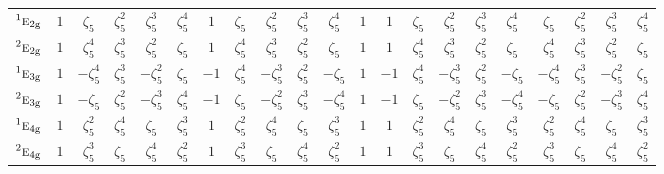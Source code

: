 \documentclass[10pt,a4paper]{article}
\numberwithin{equation}{section}
\newcommand{\irr}[1]{\text{\normalfont\scshape #1}}
\newcommand{\conjpair}[1]{{}^{#1}}
\newcommand{\ptag}[1]{\mathrm{#1}}
\newcommand{\rootunity}[1]{\zeta_{#1}}
\begin{document}
{\begin{longtable}{@{}lcccccccccccccccccccc@{}}
$\conjpair{1}\irr{e}_{2\ptag{g}}$ & $1$ & $\rootunity{5}$ & $\rootunity{5}^{2}$ & $\rootunity{5}^{3}$ & $\rootunity{5}^{4}$ & $1$ & $\rootunity{5}$ & $\rootunity{5}^{2}$ & $\rootunity{5}^{3}$ & $\rootunity{5}^{4}$ & $1$ & $1$ & $\rootunity{5}$ & $\rootunity{5}^{2}$ & $\rootunity{5}^{3}$ & $\rootunity{5}^{4}$ & $\rootunity{5}$ & $\rootunity{5}^{2}$ & $\rootunity{5}^{3}$ & $\rootunity{5}^{4}$\\
$\conjpair{2}\irr{e}_{2\ptag{g}}$ & $1$ & $\rootunity{5}^{4}$ & $\rootunity{5}^{3}$ & $\rootunity{5}^{2}$ & $\rootunity{5}$ & $1$ & $\rootunity{5}^{4}$ & $\rootunity{5}^{3}$ & $\rootunity{5}^{2}$ & $\rootunity{5}$ & $1$ & $1$ & $\rootunity{5}^{4}$ & $\rootunity{5}^{3}$ & $\rootunity{5}^{2}$ & $\rootunity{5}$ & $\rootunity{5}^{4}$ & $\rootunity{5}^{3}$ & $\rootunity{5}^{2}$ & $\rootunity{5}$\\
$\conjpair{1}\irr{e}_{3\ptag{g}}$ & $1$ & $-\rootunity{5}^{4}$ & $\rootunity{5}^{3}$ & $-\rootunity{5}^{2}$ & $\rootunity{5}$ & $-1$ & $\rootunity{5}^{4}$ & $-\rootunity{5}^{3}$ & $\rootunity{5}^{2}$ & $-\rootunity{5}$ & $1$ & $-1$ & $\rootunity{5}^{4}$ & $-\rootunity{5}^{3}$ & $\rootunity{5}^{2}$ & $-\rootunity{5}$ & $-\rootunity{5}^{4}$ & $\rootunity{5}^{3}$ & $-\rootunity{5}^{2}$ & $\rootunity{5}$\\
$\conjpair{2}\irr{e}_{3\ptag{g}}$ & $1$ & $-\rootunity{5}$ & $\rootunity{5}^{2}$ & $-\rootunity{5}^{3}$ & $\rootunity{5}^{4}$ & $-1$ & $\rootunity{5}$ & $-\rootunity{5}^{2}$ & $\rootunity{5}^{3}$ & $-\rootunity{5}^{4}$ & $1$ & $-1$ & $\rootunity{5}$ & $-\rootunity{5}^{2}$ & $\rootunity{5}^{3}$ & $-\rootunity{5}^{4}$ & $-\rootunity{5}$ & $\rootunity{5}^{2}$ & $-\rootunity{5}^{3}$ & $\rootunity{5}^{4}$\\
$\conjpair{1}\irr{e}_{4\ptag{g}}$ & $1$ & $\rootunity{5}^{2}$ & $\rootunity{5}^{4}$ & $\rootunity{5}$ & $\rootunity{5}^{3}$ & $1$ & $\rootunity{5}^{2}$ & $\rootunity{5}^{4}$ & $\rootunity{5}$ & $\rootunity{5}^{3}$ & $1$ & $1$ & $\rootunity{5}^{2}$ & $\rootunity{5}^{4}$ & $\rootunity{5}$ & $\rootunity{5}^{3}$ & $\rootunity{5}^{2}$ & $\rootunity{5}^{4}$ & $\rootunity{5}$ & $\rootunity{5}^{3}$\\
$\conjpair{2}\irr{e}_{4\ptag{g}}$ & $1$ & $\rootunity{5}^{3}$ & $\rootunity{5}$ & $\rootunity{5}^{4}$ & $\rootunity{5}^{2}$ & $1$ & $\rootunity{5}^{3}$ & $\rootunity{5}$ & $\rootunity{5}^{4}$ & $\rootunity{5}^{2}$ & $1$ & $1$ & $\rootunity{5}^{3}$ & $\rootunity{5}$ & $\rootunity{5}^{4}$ & $\rootunity{5}^{2}$ & $\rootunity{5}^{3}$ & $\rootunity{5}$ & $\rootunity{5}^{4}$ & $\rootunity{5}^{2}$\\

\end{longtable}}
\end{document}
